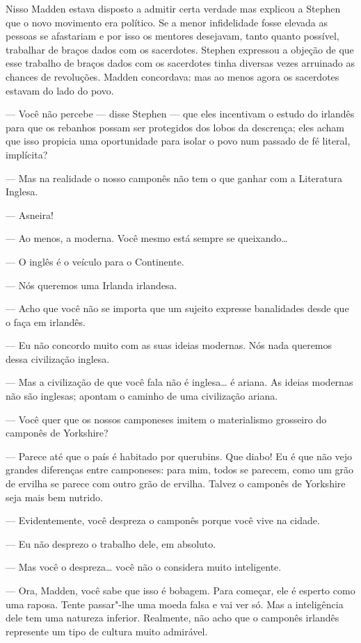 Nisso Madden estava disposto a admitir certa verdade mas explicou a
Stephen que o novo movimento era político.  Se a menor infidelidade		
fosse elevada as pessoas se afastariam e por isso os mentores
desejavam, tanto quanto possível, trabalhar de braços dados com os
sacerdotes.  Stephen expressou a objeção de que esse trabalho de braços
dados com os sacerdotes tinha diversas vezes arruinado as chances de
revoluções.  Madden concordava: mas ao menos agora os sacerdotes
estavam do lado do povo.

--- Você não percebe --- disse Stephen --- que eles incentivam o
estudo do irlandês para que os rebanhos possam ser protegidos dos
\label{lobos"-da} lobos da descrença; eles acham que isso propicia uma oportunidade
para isolar o povo num passado de fé literal, implícita?

--- Mas na realidade o nosso camponês não tem o que ganhar com a
Literatura Inglesa.

--- Asneira!

--- Ao menos, a moderna.  Você mesmo está sempre se queixando\ldots{}

--- O inglês é o veículo para o Continente.

--- Nós queremos uma Irlanda irlandesa.

--- Acho que você não se importa que um sujeito expresse
banalidades desde que o faça em irlandês.

--- Eu não concordo muito com as suas ideias modernas.  Nós nada
queremos dessa civilização inglesa.

--- Mas a civilização de que você fala não é inglesa\ldots{} é ariana.
As ideias modernas não são inglesas; apontam o caminho de uma
civilização ariana.

--- Você quer que os nossos camponeses imitem o materialismo
grosseiro do camponês de Yorkshire?

--- Parece até que o país é habitado por querubins.  Que diabo!
Eu é que não vejo grandes diferenças entre camponeses: para mim, todos
se parecem, como um grão de ervilha se parece com outro grão de
ervilha.  Talvez o camponês de Yorkshire seja mais bem nutrido.

--- Evidentemente, você despreza o camponês porque você vive na
cidade.

--- Eu não desprezo o trabalho dele, em absoluto.

--- Mas você o despreza\ldots{} você não o considera muito
inteligente.

--- Ora, Madden, você sabe que isso é bobagem.  Para começar, ele
é esperto como uma raposa.  Tente passar"-lhe uma moeda falsa e vai ver
só.  Mas a inteligência dele tem uma natureza inferior.  Realmente, não
acho que o camponês irlandês \label{represente} represente um tipo de cultura muito
admirável.

